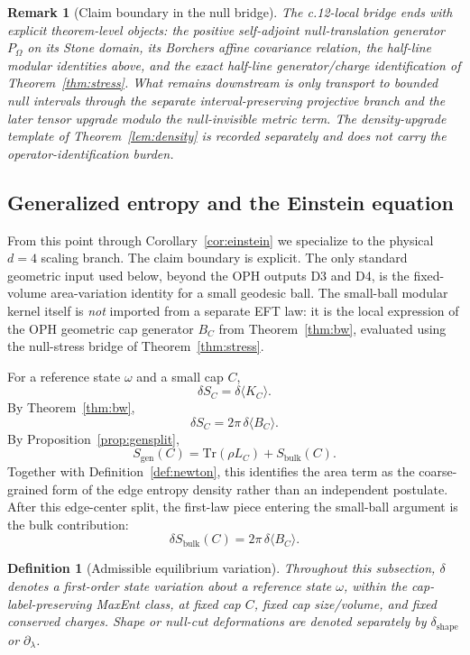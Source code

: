 \documentclass[11pt]{article}
\newtheorem{definition}[theorem]{Definition}
\newtheorem{remark}[theorem]{Remark}
\begin{document}
\begin{remark}[Claim boundary in the null bridge]
The c.12-local bridge ends with explicit theorem-level objects: the positive self-adjoint null-translation generator \(P_\Omega\) on its Stone domain, its Borchers affine covariance relation, the half-line modular identities above, and the exact half-line generator/charge identification of Theorem~\ref{thm:stress}. What remains downstream is only transport to bounded null intervals through the separate interval-preserving projective branch and the later tensor upgrade modulo the null-invisible metric term. The density-upgrade template of Theorem~\ref{lem:density} is recorded separately and does not carry the operator-identification burden.
\end{remark}
\subsection{Generalized entropy and the Einstein equation}

From this point through Corollary~\ref{cor:einstein} we specialize to the physical $d=4$ scaling branch. The claim boundary is explicit. The only standard geometric input used below, beyond the OPH outputs D3 and D4, is the fixed-volume area-variation identity for a small geodesic ball. The small-ball modular kernel itself is \emph{not} imported from a separate EFT law: it is the local expression of the OPH geometric cap generator $B_C$ from Theorem~\ref{thm:bw}, evaluated using the null-stress bridge of Theorem~\ref{thm:stress}.

For a reference state $\omega$ and a small cap $C$,
\[
\delta S_C=\delta \langle K_C\rangle.
\]
By Theorem~\ref{thm:bw},
\[
\delta S_C = 2\pi\,\delta\langle B_C\rangle.
\]
By Proposition~\ref{prop:gensplit},
\[
S_{\mathrm{gen}}(C)=\mathrm{Tr}(\rho L_C)+S_{\mathrm{bulk}}(C).
\]
Together with Definition~\ref{def:newton}, this identifies the area term as the coarse-grained form of the edge entropy density rather than an independent postulate. After this edge-center split, the first-law piece entering the small-ball argument is the bulk contribution:
\[
\delta S_{\mathrm{bulk}}(C)=2\pi\,\delta\langle B_C\rangle.
\]

\begin{definition}[Admissible equilibrium variation]
Throughout this subsection, $\delta$ denotes a first-order state variation about a reference state $\omega$, within the cap-label-preserving MaxEnt class, at fixed cap $C$, fixed cap size/volume, and fixed conserved charges. Shape or null-cut deformations are denoted separately by $\delta_{\mathrm{shape}}$ or $\partial_\lambda$.
\end{definition}
\end{document}
